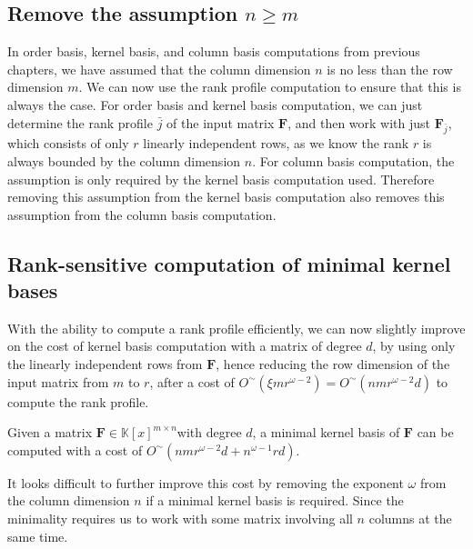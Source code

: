\subsection{\label{sub:removeDimensionAssumption}Remove the assumption $n\ge m$}

In order basis, kernel basis, and column basis computations from previous
chapters, we have assumed that the column dimension $n$ is no less
than the row dimension $m.$ We can now use the rank profile computation
to ensure that this is always the case. For order basis and kernel
basis computation, we can just determine the rank profile $\bar{j}$
of the input matrix $\mathbf{F}$, and then work with just $\mathbf{F}_{\bar{j}}$,
which consists of only $r$ linearly independent rows, as we know
the rank $r$ is always bounded by the column dimension $n$. For
column basis computation, the assumption is only required by the kernel
basis computation used. Therefore removing this assumption from the
kernel basis computation also removes this assumption from the column
basis computation.


\subsection{Rank-sensitive computation of minimal kernel bases}

With the ability to compute a rank profile efficiently, we can now
slightly improve  on the
cost of kernel basis computation with a matrix of degree $d$, by
using only the linearly independent rows from $\mathbf{F}$, hence
reducing the row dimension of the input matrix from $m$ to $r$,
after a cost of $O^{\sim}\left(\xi mr^{\omega-2}\right)=O^{\sim}\left(nmr^{\omega-2}d\right)$
to compute the rank profile. 
\begin{thm}
Given a matrix $\mathbf{F}\in\mathbb{K}\left[x\right]^{m\times n}$with
degree $d$, a minimal kernel basis of $\mathbf{F}$ can be computed
with a cost of $O^{\sim}(nmr^{\omega-2}d+n^{\omega-1}rd)$.
\end{thm}
It looks difficult to further improve this cost by removing the exponent
$\omega$ from the column dimension $n$ if a minimal kernel basis
is required. Since the minimality requires us to work with some matrix
involving all $n$ columns at the same time. 
